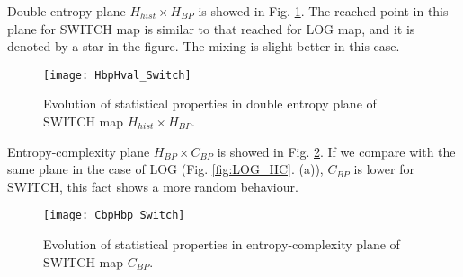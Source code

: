 Double entropy plane $H_{hist} \times H_{BP}$ is showed in Fig. \ref{fig:SWITCH_HH}.
The reached point in this plane for SWITCH map is similar to that reached for LOG map, and it is denoted by a star in the figure.
The mixing is slight better in this case.

\begin{figure}
	\centering
	\texttt{[image: HbpHval\_Switch]}
	\caption{Evolution of statistical properties in double entropy plane of SWITCH map $H_{hist} \times H_{BP}$.}
	\label{fig:SWITCH_HH}
\end{figure}

Entropy-complexity plane $H_{BP} \times C_{BP}$ is showed in Fig. \ref{fig:SWITCH_HC}.
If we compare with the same plane in the case of LOG (Fig. \ref{fig:LOG_HC}. (a)), $C_{BP}$ is lower for SWITCH, this fact shows a more random behaviour.

\begin{figure}
	\centering
	\texttt{[image: CbpHbp\_Switch]}
	\caption{Evolution of statistical properties in entropy-complexity plane of SWITCH map $C_{BP}$.}
	\label{fig:SWITCH_HC}
\end{figure}